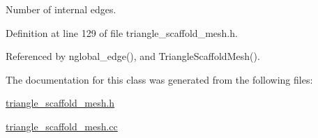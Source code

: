Number of internal edges. 



Definition at line 129 of file triangle\+\_\+scaffold\+\_\+mesh.\+h.



Referenced by nglobal\+\_\+edge(), and Triangle\+Scaffold\+Mesh().



The documentation for this class was generated from the following files\+:\begin{DoxyCompactItemize}
\item 
\hyperlink{triangle__scaffold__mesh_8h}{triangle\+\_\+scaffold\+\_\+mesh.\+h}\item 
\hyperlink{triangle__scaffold__mesh_8cc}{triangle\+\_\+scaffold\+\_\+mesh.\+cc}\end{DoxyCompactItemize}
